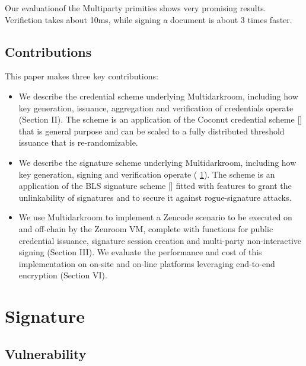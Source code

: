\documentclass{article}
\begin{document}
Our evaluationof the Multiparty primities shows very promising
results. Verifiction takes about 10ms,  while signing a document is
about 3 times faster. 

\subsection{Contributions}

This paper makes three key contributions:

\begin{itemize}

\item We describe the credential scheme underlying Multidarkroom,
  including how key generation, issuance, aggregation and verification
  of credentials operate (Section II). The scheme is an application of
  the Coconut credential scheme [] that is general purpose and can be
  scaled to a fully distributed threshold issuance that is
  re-randomizable.

\item We describe the signature scheme underlying Multidarkroom,
  including how key generation, signing and verification operate (
  \ref{sec:signature}). The scheme is an application of the BLS
  signature scheme [] fitted with features to grant the unlinkability
  of signatures and to secure it against rogue-signature attacks.

\item We use Multidarkroom to implement a Zencode scenario to be
  executed on and off-chain by the Zenroom VM, complete with functions
  for public credential issuance, signature session creation and
  multi-party non-interactive signing (Section III). We evaluate the
  performance and cost of this implementation on on-site and on-line
  platforms leveraging end-to-end encryption (Section VI).

\end{itemize}

\section{Signature}
\label{sec:signature}

\lipsum[1]

\subsection{Vulnerability}
\lipsum[2]

\end{document}
